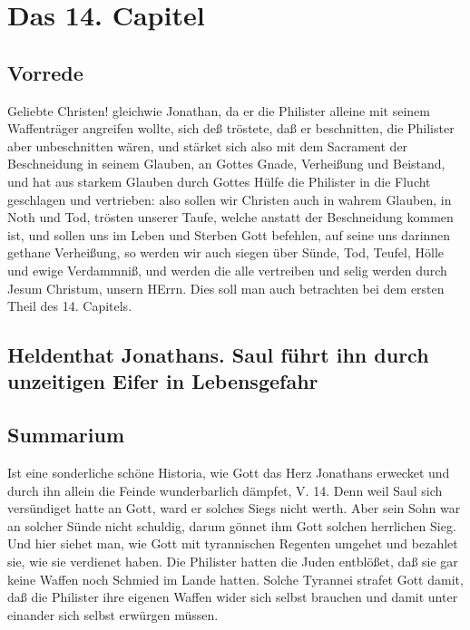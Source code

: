 \chapter{Das 14. Capitel}

\section{Vorrede}

Geliebte Christen! gleichwie Jonathan, da er die Philister alleine mit seinem Waffenträger angreifen wollte, sich deß tröstete, daß er beschnitten, die Philister aber unbeschnitten wären, und stärket sich also mit dem Sacrament der Beschneidung in seinem Glauben, an Gottes Gnade, Verheißung und Beistand, und hat aus starkem Glauben durch Gottes Hülfe die Philister in die Flucht geschlagen und vertrieben: also sollen wir Christen auch in wahrem Glauben, in Noth und Tod, trösten unserer Taufe, welche anstatt der Beschneidung kommen ist, und sollen uns im Leben und Sterben Gott befehlen, auf seine uns darinnen gethane Verheißung, so werden wir auch siegen über Sünde, Tod, Teufel, Hölle und ewige Verdammniß, und werden die alle vertreiben und selig werden durch Jesum Christum, unsern HErrn. Dies soll man auch betrachten bei dem ersten Theil des 14. Capitels.

\section[Heldenthat Jonathans. Saul führt ihn durch unzeitigen Eifer]{Heldenthat Jonathans. Saul führt ihn durch unzeitigen Eifer in Lebensgefahr}

\section{Summarium}

Ist eine sonderliche schöne Historia, wie Gott das Herz Jonathans erwecket und durch ihn allein die Feinde wunderbarlich dämpfet, V. 14. Denn weil Saul sich versündiget hatte an Gott, ward er solches Siegs nicht werth. Aber sein Sohn war an solcher Sünde nicht schuldig, darum gönnet ihm Gott solchen herrlichen Sieg. Und hier siehet man, wie Gott mit tyrannischen Regenten umgehet und bezahlet sie, wie sie verdienet haben. Die Philister hatten die Juden entblößet, daß sie gar keine Waffen noch Schmied im Lande hatten. Solche Tyrannei strafet Gott damit, daß die Philister ihre eigenen Waffen wider sich selbst brauchen und damit unter einander sich selbst erwürgen müssen.

